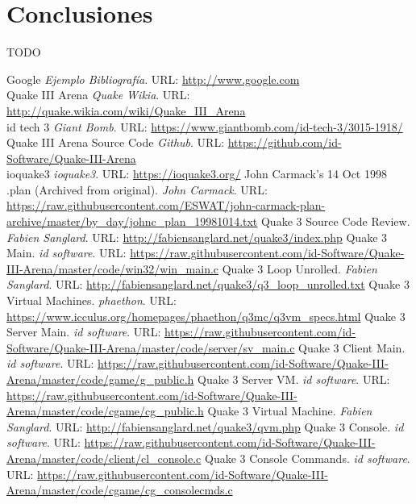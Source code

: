 \documentclass[a4paper,12pt]{report}
\begin{document}
	\section{Conclusiones}
	TODO\\
    
	
	
	
	\begin{appendices}
	\end{appendices}
	
	\begin{thebibliography}{9}
		
		Google \emph{Ejemplo Bibliografía}. URL: \url{http://www.google.com}\\
		Quake III Arena \emph{Quake Wikia}. URL: \url{http://quake.wikia.com/wiki/Quake_III_Arena}\\
		 id tech 3 \emph{Giant Bomb}. URL: \url{https://www.giantbomb.com/id-tech-3/3015-1918/}\\
		 Quake III Arena Source Code \emph{Github}. URL: \url{https://github.com/id-Software/Quake-III-Arena}\\
		 ioquake3 \emph{ioquake3}. URL: \url{https://ioquake3.org/}
         John Carmack's 14 Oct 1998 .plan (Archived from original). \emph{John Carmack}. URL: \url{https://raw.githubusercontent.com/ESWAT/john-carmack-plan-archive/master/by_day/johnc_plan_19981014.txt}
		 Quake 3 Source Code Review. \emph{Fabien Sanglard}. URL: \url{http://fabiensanglard.net/quake3/index.php}
		 Quake 3 Main. \emph{id software}. URL: \url{https://raw.githubusercontent.com/id-Software/Quake-III-Arena/master/code/win32/win_main.c}
         Quake 3 Loop Unrolled. \emph{Fabien Sanglard}. URL: \url{http://fabiensanglard.net/quake3/q3_loop_unrolled.txt}
         Quake 3 Virtual Machines. \emph{phaethon}. URL: \url{https://www.icculus.org/homepages/phaethon/q3mc/q3vm_specs.html}
         Quake 3 Server Main. \emph{id software}. URL: \url{https://raw.githubusercontent.com/id-Software/Quake-III-Arena/master/code/server/sv_main.c}
         Quake 3 Client Main. \emph{id software}. URL: \url{https://raw.githubusercontent.com/id-Software/Quake-III-Arena/master/code/game/g_public.h}
         Quake 3 Server VM. \emph{id software}. URL: \url{https://raw.githubusercontent.com/id-Software/Quake-III-Arena/master/code/cgame/cg_public.h}
         Quake 3 Virtual Machine. \emph{Fabien Sanglard}. URL: \url{http://fabiensanglard.net/quake3/qvm.php}
		 Quake 3 Console. \emph{id software}. URL: \url{https://raw.githubusercontent.com/id-Software/Quake-III-Arena/master/code/client/cl_console.c}
		 Quake 3 Console Commands. \emph{id software}. URL: \url{https://raw.githubusercontent.com/id-Software/Quake-III-Arena/master/code/cgame/cg_consolecmds.c}		
	\end{thebibliography}


	
	
\end{document}
